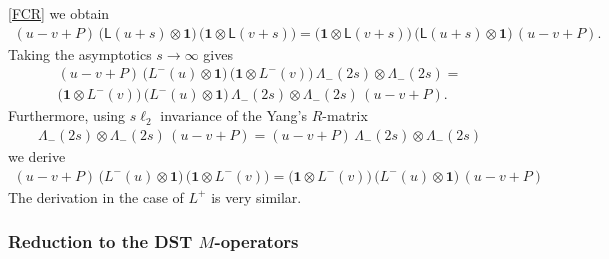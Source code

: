 \documentclass[11pt]{article}
\numberwithin{equation}{section}
\theoremstyle{plain}
\theoremstyle{definition}
\begin{document}
\eqref{FCR} we obtain 
\begin{align*}
	\textstyle \left(u-v  + P\right)\, \bigl(\mathsf{L}(u+s)\otimes \bm{1}\bigr)\, 
	\bigl(\bm{1} \otimes \mathsf{L}(v+s)\bigr)
	= \bigl(\bm{1} \otimes \mathsf{L}(v+s)\bigr)\,
	\bigl(\mathsf{L}(u+s)\otimes \bm{1}\bigr)\, \left(u-v  + P\right).
\end{align*}
Taking the asymptotics $s \to \infty$ gives
\begin{align*}
	\textstyle \left(u-v  + P\right)\, \bigl(L^{-}(u)\otimes \bm{1}\bigr)\, 
	\bigl(\bm{1} \otimes L^{-}(v)\bigr)\, 
	\Lambda_{-}(2s)\otimes\Lambda_{-}(2s)
	= \\[6pt] 
	\textstyle \bigl(\bm{1} \otimes L^{-}(v)\bigr)\,
	\bigl(L^{-}(u)\otimes \bm{1}\bigr)\,
	\Lambda_{-}(2s)\otimes\Lambda_{-}(2s)\,\left(u-v  + P\right).
\end{align*}
Furthermore, using $s\ell_2$ invariance of the Yang's $R$-matrix 
\begin{align}
	\Lambda_{-}(2s)\otimes\Lambda_{-}(2s)\,\left(u-v  + P\right) = 
	\left(u-v  + P\right)\,\Lambda_{-}(2s)\otimes\Lambda_{-}(2s)
\end{align}
we derive 
\begin{align*}
	\textstyle \left(u-v  + P\right)\, \bigl(L^{-}(u)\otimes \bm{1}\bigr)\, 
	\bigl(\bm{1} \otimes L^{-}(v)\bigr)
	=  
	\bigl(\bm{1} \otimes L^{-}(v)\bigr)\,
	\bigl(L^{-}(u)\otimes \bm{1}\bigr)\, \left(u-v  + P\right)
\end{align*}
The derivation in the case of $L^{+}$ is very similar. 

\subsubsection{Reduction to the DST $M$-operators}
\end{document}
